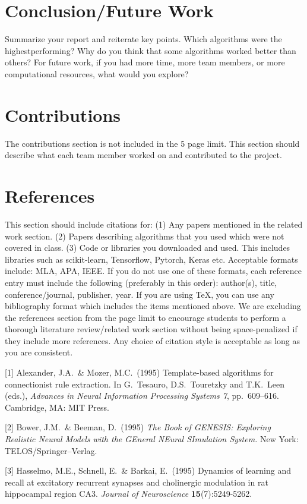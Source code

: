 \documentclass{article}
\begin{document}
\section{Conclusion/Future Work }
Summarize your report and reiterate key points. Which algorithms were the highestperforming?
Why do you think that some algorithms worked better than others? For
future work, if you had more time, more team members, or more computational resources,
what would you explore?

\section{Contributions}
The contributions section is not included in the 5 page limit. This section should describe
what each team member worked on and contributed to the project.

\section*{References}
This section should include citations for: (1) Any papers mentioned in the related work
section. (2) Papers describing algorithms that you used which were not covered in class.
(3) Code or libraries you downloaded and used. This includes libraries such as scikit-learn, Tensorflow, Pytorch, Keras etc. Acceptable formats include: MLA, APA, IEEE. If you
do not use one of these formats, each reference entry must include the following (preferably
in this order): author(s), title, conference/journal, publisher, year. If you are using TeX,
you can use any bibliography format which includes the items mentioned above. We are excluding
the references section from the page limit to encourage students to perform a thorough
literature review/related work section without being space-penalized if they include more
references. Any choice of citation style is acceptable
as long as you are consistent. 

\medskip
\small
[1] Alexander, J.A.\ \& Mozer, M.C.\ (1995) Template-based algorithms
for connectionist rule extraction. In G.\ Tesauro, D.S.\ Touretzky and
T.K.\ Leen (eds.), {\it Advances in Neural Information Processing
  Systems 7}, pp.\ 609--616. Cambridge, MA: MIT Press.

[2] Bower, J.M.\ \& Beeman, D.\ (1995) {\it The Book of GENESIS:
  Exploring Realistic Neural Models with the GEneral NEural SImulation
  System.}  New York: TELOS/Springer--Verlag.

[3] Hasselmo, M.E., Schnell, E.\ \& Barkai, E.\ (1995) Dynamics of
learning and recall at excitatory recurrent synapses and cholinergic
modulation in rat hippocampal region CA3. {\it Journal of
  Neuroscience} {\bf 15}(7):5249-5262.
\end{document}
